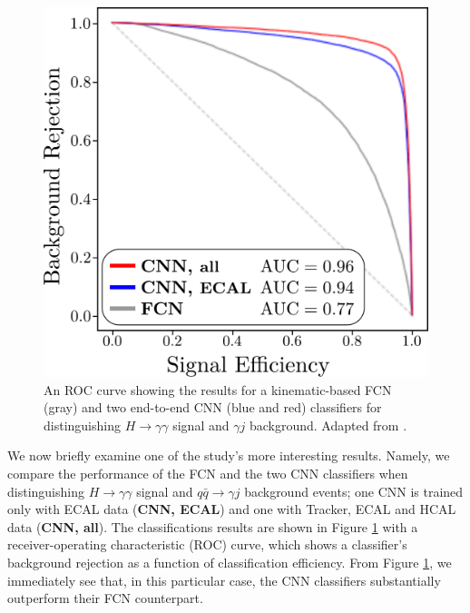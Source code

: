 \documentclass[11pt, a4paper]{article}
\begin{document}
\begin{figure}
    \centering
    \includegraphics[width=\linewidth]{raster/raster-svg/roc.pdf}
    \vspace{-8mm}
    \null \hspace{10mm}\caption{An ROC curve showing the results for a kinematic-based FCN (gray) and two end-to-end CNN (blue and red) classifiers for distinguishing $ H \to \gamma \gamma $ signal and $ \gamma j $ background. Adapted from \cite{andrews-higgs}.}
    \label{fig:andrews-roc}
\end{figure}

We now briefly examine one of the study's more interesting results. Namely, we compare the performance of the FCN and the two CNN classifiers when distinguishing $ H \to \gamma \gamma $ signal and $ q \bar{q} \to \gamma j $ background events; one CNN is trained only with ECAL data (\textbf{CNN, \small{ECAL}}) and one with Tracker, ECAL and HCAL data (\textbf{CNN, \small{all}}). The classifications results are shown in Figure \ref{fig:andrews-roc} with a receiver-operating characteristic (ROC) curve, which shows a classifier's background rejection as a function of classification efficiency. From Figure \ref{fig:andrews-roc}, we immediately see that, in this particular case, the CNN classifiers substantially outperform their FCN counterpart.
\end{document}
